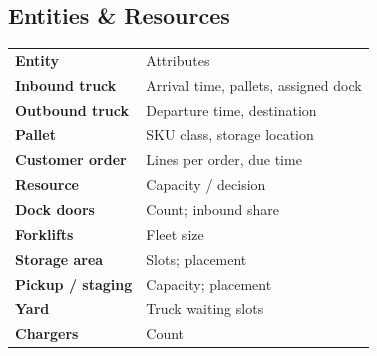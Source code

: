 \documentclass[10pt]{selfArx}
\begin{document}
\subsection*{Entities \& Resources}
{\small
\renewcommand{\arraystretch}{1.15}
\setlength{\tabcolsep}{3pt}
\noindent\begin{tabularx}{\columnwidth}{>{\bfseries}P{2.3cm}L}
 Entity & Attributes \\
Inbound truck  & Arrival time, pallets, assigned dock \\
Outbound truck & Departure time, destination \\
Pallet         & SKU class, storage location \\
Customer order & Lines per order, due time \\
 Resource & Capacity / decision \\
Dock doors       & Count; inbound share \\
Forklifts        & Fleet size \\
Storage area     & Slots; placement \\
Pickup / staging & Capacity; placement \\
Yard             & Truck waiting slots \\
Chargers         & Count \\
\end{tabularx}}
\end{document}
